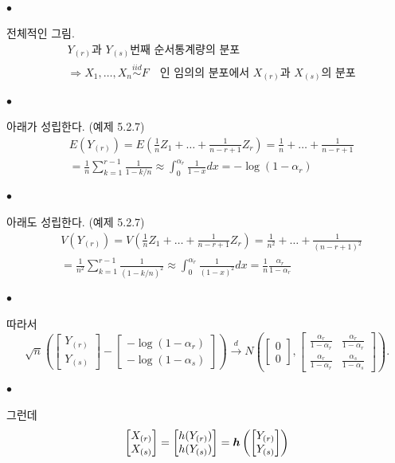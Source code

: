 \documentclass[12pt,oneside,english]{book}
\def\ck{\paragraph{\Large$\bullet$}\Large}
\newcommand{\bsh}{\mbox{\boldmath $h$}}
\begin{document}
\ck 전체적인 그림.
\begin{align*}
& \mbox{$Y_{(r)}$과 $Y_{(s)}$번째 순서통계량의 분포} \\ 
& \Longrightarrow X_1,\dots,X_n \overset{iid}{\sim} F \quad \mbox{인 임의의 분포에서 $X_{(r)}$과 $X_{(s)}$의 분포}
\end{align*}


\ck 아래가 성립한다. (예제 5.2.7)
\begin{align*}
& E(Y_{(r)})=E\left(\frac{1}{n}Z_1+\dots+\frac{1}{n-r+1}Z_r\right)=
\frac{1}{n}+\dots+\frac{1}{n-r+1} \\ 
& =\frac{1}{n} \sum_{k=1}^{r-1}\frac{1}{1-k/n} \approx \int_0^{\alpha_r}\frac{1}{1-x}dx=-\log(1-\alpha_r)
\end{align*}

\ck 아래도 성립한다. (예제 5.2.7)
\begin{align*}
&V(Y_{(r)})= V\left(\frac{1}{n}Z_1+\dots+\frac{1}{n-r+1}Z_r\right)=
\frac{1}{n^2}+\dots+\frac{1}{(n-r+1)^2} \\ 
& =\frac{1}{n^2} \sum_{k=1}^{r-1}\frac{1}{(1-k/n)^2} \approx \int_0^{\alpha_r}\frac{1}{(1-x)^2}dx=\frac{1}{n}\frac{\alpha_r}{1-\alpha_r}
\end{align*}

\ck 따라서 
\[
\sqrt{n}\left(\begin{bmatrix}Y_{(r)} \\ Y_{(s)}\end{bmatrix}-\begin{bmatrix}-\log(1-\alpha_r) \\ -\log(1-\alpha_s)\end{bmatrix}\right)\overset{d}{\to} N\left(\begin{bmatrix}0\\0\end{bmatrix},\begin{bmatrix} \frac{\alpha_r}{1-\alpha_r} & \frac{\alpha_r}{1-\alpha_r} \\ \frac{\alpha_r}{1-\alpha_r} & \frac{\alpha_s}{1-\alpha_s} \end{bmatrix}\right).
\]


\ck 그런데 
\[
\begin{bmatrix} X_{(r)}\\ X_{(s)} \end{bmatrix}=\begin{bmatrix} h(Y_{(r)})\\  h(Y_{(s)}) \end{bmatrix}=\bsh \left(\begin{bmatrix}Y_{(r)} \\ Y_{(s)}\end{bmatrix}\right)
\]
\end{document}
